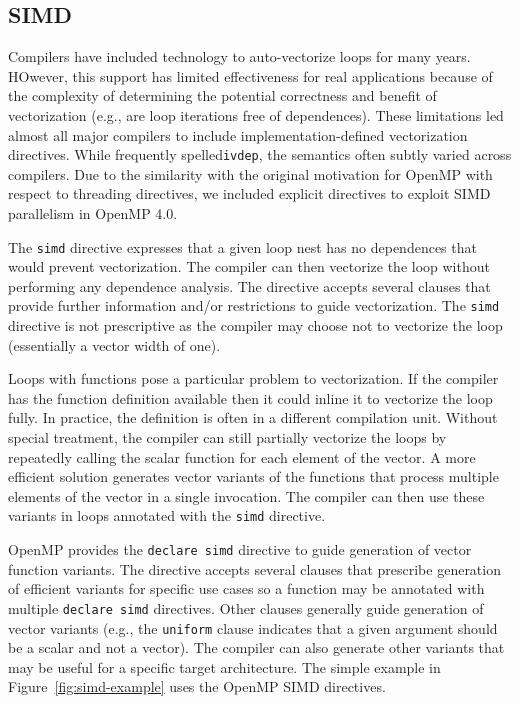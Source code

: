 \subsection{SIMD}
\label{sub:simd}

Compilers have included technology to auto-vectorize loops for many years. 
HOwever, this support has limited effectiveness for real applications because 
of the complexity of determining the potential correctness and benefit of 
vectorization (e.g., are loop iterations free of dependences). These 
limitations led almost all major compilers to include implementation-defined 
vectorization directives. While frequently spelled\texttt{ivdep}, the
semantics often subtly varied across compilers. Due to the similarity 
with the original motivation for OpenMP with respect to threading 
directives, we included explicit directives to exploit SIMD parallelism 
in OpenMP 4.0.

The \texttt{simd} directive expresses that a given loop nest has no
dependences that would prevent vectorization. The compiler can then 
vectorize the loop without performing any dependence analysis. The 
directive accepts several clauses that provide further information 
and/or restrictions to guide vectorization. The \texttt{simd} directive 
is not prescriptive as the compiler may choose not to vectorize the 
loop (essentially a vector width of one).

Loops with functions pose a particular problem to vectorization. If the 
compiler has the function definition available then it could inline it 
to vectorize the loop fully. In practice, the definition is often in a
different compilation unit. Without special treatment, the compiler can
still partially vectorize the loops by repeatedly calling the scalar 
function for each element of the vector. A more efficient solution 
generates vector variants of the functions that process multiple 
elements of the vector in a single invocation. The compiler can then
use these variants in loops annotated with the \texttt{simd} directive.

OpenMP provides the \texttt{declare simd} directive to guide generation
of vector function variants. The directive accepts several clauses that
prescribe generation of efficient variants for specific use cases so a
function may be annotated with multiple \texttt{declare simd} directives.
Other clauses generally guide generation of vector variants (e.g., the 
\texttt{uniform} clause indicates that a given argument should be a 
scalar and not a vector). The compiler can also generate other variants 
that may be useful for a specific target architecture. The simple example 
in Figure~\ref{fig:simd-example} uses the OpenMP SIMD directives.

